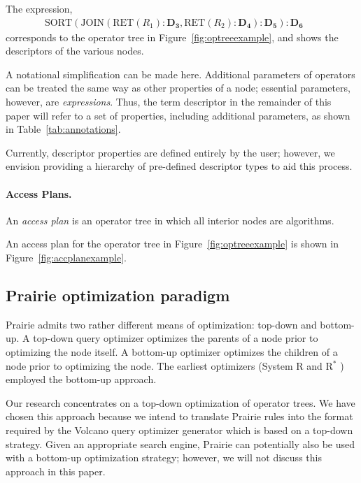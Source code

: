 \begin{example}
The expression,
\begin{eqnarray*}
{\scriptstyle \text{SORT}(\text{JOIN}(\text{RET}(R_1):\mathbf{D_3},
      \text{RET}(R_2):\mathbf{D_4}):\mathbf{D_5}):\mathbf{D_6}} & &
\end{eqnarray*}
corresponds to the operator tree in Figure~\ref{fig:optreeexample}, and
shows the descriptors of the various nodes.
\end{example}

A notational simplification can be made here.  Additional parameters
of operators can be treated the same way as other properties of a node;
essential parameters, however, are \emph{expressions}.  Thus, the term
descriptor in the remainder of this paper will refer to a set of properties,
including additional parameters, as shown in Table~\ref{tab:annotations}.

Currently, descriptor properties are defined entirely by the user;
however, we envision providing a hierarchy of pre-defined descriptor
types to aid this process.

\paragraph{Access Plans.}
An \emph{access plan} is an operator tree in which all interior nodes
are algorithms.

\begin{example}
An access plan for the operator tree in Figure~\ref{fig:optreeexample}
is shown in Figure~\ref{fig:accplanexample}.
\end{example}

\subsection{Prairie optimization paradigm}
\label{sec:topdown}

Prairie admits two rather different means of optimization: top-down and
bottom-up.  A top-down query optimizer optimizes the parents of a node
prior to optimizing the node itself.  A bottom-up optimizer optimizes
the children of a node prior to optimizing the node.  The earliest
optimizers (System R \cite{Seli79} and R$^*$ \cite{Dani82}) employed
the bottom-up approach.

Our research concentrates on a top-down optimization of operator
trees.  We have chosen this approach because we intend to translate
Prairie rules into the format required by the Volcano query optimizer
generator \cite{Grae90b} which is based on a top-down strategy.
Given an appropriate search engine, Prairie can potentially also be
used with a bottom-up optimization strategy; however, we will not
discuss this approach in this paper.

